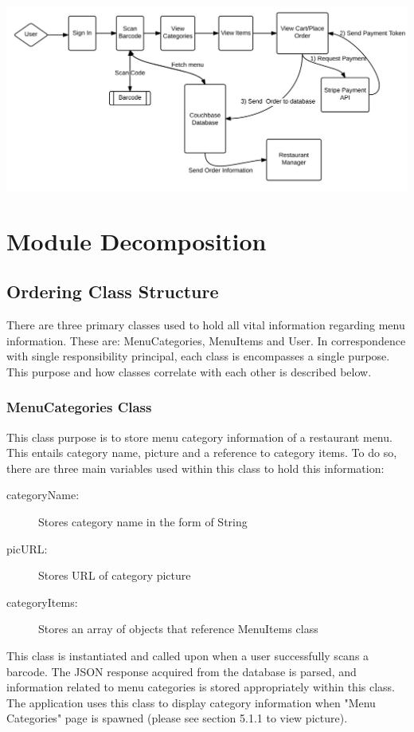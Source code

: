 \documentclass[12pt, titlepage]{article}
\begin{document}
\includegraphics[width=150mm,scale=0.5]{OverallOperation.png}

\section{Module Decomposition}


\subsection{Ordering Class Structure}
There are three primary classes used to hold all vital information regarding menu information. These are: MenuCategories, MenuItems and User. In correspondence with single responsibility principal, each class is encompasses a single purpose. This purpose and how classes correlate with each other is described below. 

\subsubsection{MenuCategories Class}
This class purpose is to store menu category information of a restaurant menu. This entails category name, picture and a reference to category items. To do so, there are three main variables used within this class to hold this information: 

\begin{description}
  \item[categoryName:] Stores category name in the form of String
  \item[picURL:] Stores URL of category picture
  \item[categoryItems:] Stores an array of objects that reference MenuItems class
\end{description}


This class is instantiated and called upon when a user successfully scans a barcode. The JSON response acquired from the database is parsed, and information related to menu categories is stored appropriately within this class. The application uses this class to display category information when "Menu Categories" page is spawned (please see section 5.1.1 to view picture).
\end{document}
